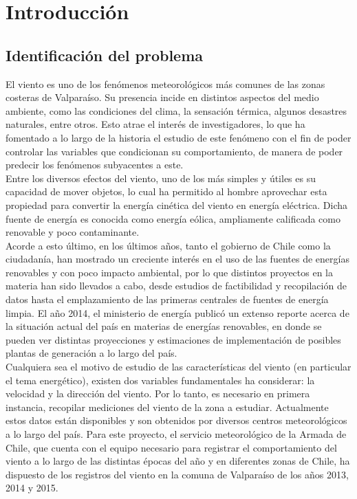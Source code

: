
\chapter{Introducción}

\section{Identificación del problema}
El viento es uno de los fenómenos meteorológicos más comunes de las zonas costeras de Valparaíso. Su presencia incide en distintos aspectos del medio ambiente, como las condiciones del clima, la sensación térmica, algunos desastres naturales, entre otros. Esto atrae el interés de investigadores, lo que ha fomentado
a lo largo de la historia el estudio de este fenómeno con el fin de poder controlar las variables que condicionan su comportamiento, de manera de poder predecir los fenómenos subyacentes a este.\\ 
Entre los diversos efectos del viento, uno de los más simples y útiles es su capacidad de mover objetos, lo cual ha permitido al hombre aprovechar esta propiedad para convertir la energía cinética del viento en energía eléctrica. Dicha fuente de energía es conocida como energía eólica, ampliamente calificada como renovable y poco contaminante.\\
Acorde a esto último, en los últimos años, tanto el gobierno de Chile como la ciudadanía, han mostrado un creciente interés en el uso de las fuentes de energías renovables y con poco impacto ambiental, por lo que distintos proyectos en la materia han sido llevados a cabo, desde estudios de factibilidad y recopilación de datos hasta el emplazamiento de las primeras centrales de fuentes de energía limpia. El año 2014, el ministerio de energía publicó un extenso reporte acerca de la situación actual del país en materias de energías renovables, en donde se pueden ver distintas proyecciones y estimaciones de implementación de posibles plantas de generación a lo largo del país. \cite{minenergia14}\\
Cualquiera sea el motivo de estudio de las características del viento (en particular el tema energético), existen dos variables fundamentales ha considerar: la velocidad y la dirección del viento. Por lo tanto, es necesario en primera instancia, recopilar mediciones del viento de la zona a estudiar.
Actualmente estos datos están disponibles y son obtenidos por diversos centros meteorológicos a lo largo del país. Para este proyecto, el servicio meteorológico de la Armada de Chile, que cuenta con el equipo necesario para registrar el comportamiento del viento a lo largo de las distintas épocas del año y en diferentes zonas de Chile, ha dispuesto de los registros del viento en la comuna de Valparaíso de los años 2013, 2014 y 2015.\\
